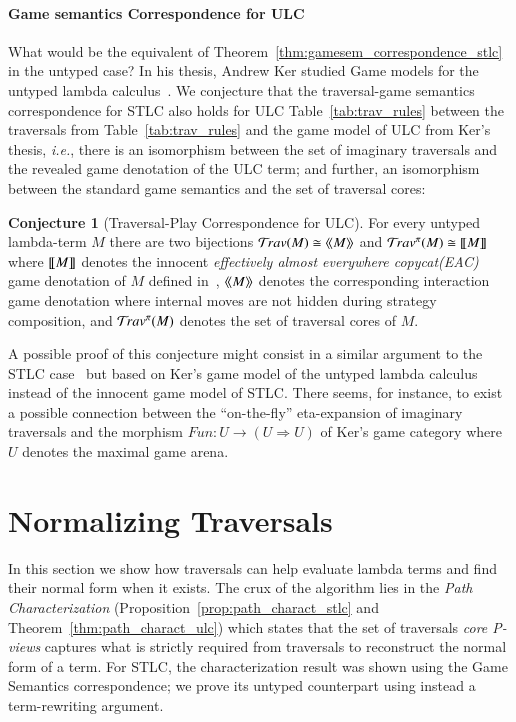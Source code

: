 \documentclass{elsarticle}
\makeatletter
\theoremstyle{plain}
\theoremstyle{definition}
\newtheorem{conjecture}{Conjecture}[section]
\theoremstyle{remark}
\newcommand{\travulc}{\travset}
\def\coresymbol{\pi} %
\renewcommand\ie{{\it i.e.\@\xspace}}
\makeatother
\begin{document}
\paragraph{Game semantics Correspondence for ULC}
What would be the equivalent of Theorem~\ref{thm:gamesem_correspondence_stlc} in the untyped case? In his thesis, Andrew Ker studied Game models for the untyped lambda calculus~\cite{KerThesis}.  We conjecture that the traversal-game semantics correspondence for STLC also holds for ULC
Table~\ref{tab:trav_rules} between the traversals from Table~\ref{tab:trav_rules} and the game model of ULC from Ker's thesis, \ie, there is an isomorphism between the set of imaginary traversals and the revealed game denotation of the ULC term; and further, an isomorphism between the standard game semantics and the set of traversal cores:

\begin{conjecture}[Traversal-Play Correspondence for ULC]
\label{conj:ulc_corresp}
For every untyped lambda-term $M$ there are two bijections
$ \travulc(M) \cong \revsem{M}$ and
 $\travulc^\coresymbol(M) \cong \sem{M}$
where ${[\![ M ]\!]}$ denotes the innocent \emph{effectively almost everywhere copycat(EAC)} game denotation of $M$ defined in~\cite{KerThesis},
${\langle\!\langle M \rangle\!\rangle}$ denotes the corresponding interaction game denotation where internal moves are not hidden during strategy composition,
and $\travulc^\coresymbol(M)$ denotes the set of traversal cores of $M$.
\end{conjecture}
A possible proof of this conjecture might consist in a similar argument to the STLC case~\cite{BlumPhd} but based on Ker's game model of the untyped lambda calculus instead of the innocent game model of STLC. There seems, for instance, to exist a possible connection between the ``on-the-fly'' eta-expansion of imaginary traversals and  the morphism $Fun : U \rightarrow (U \Rightarrow U)$ of Ker's game category where $U$ denotes the maximal game arena.

\section{Normalizing Traversals}

In this section we show how traversals can help evaluate lambda terms and find their normal form when it exists. The crux of the algorithm lies in the \emph{Path Characterization} (Proposition~\ref{prop:path_charact_stlc} and Theorem~\ref{thm:path_charact_ulc}) which states that the set of traversals \emph{core P-views} captures what is strictly required from traversals to reconstruct the normal form of a term.
For STLC, the characterization result was shown using the Game Semantics correspondence; we prove its untyped counterpart using instead a term-rewriting argument.
\end{document}
